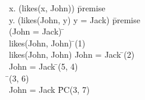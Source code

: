 \documentclass{article}
\begin{document}
\begin{proofbox}
\: \forall x. (likes(x, John)) \= \hbox{premise} \\
\: \forall y. (likes(John, y) \rightarrow y = Jack) \= \hbox{premise} \\
\open
\: \lnot (John = Jack) \= \asm \\
\: likes(John, John) \= \forallelim(1) \\
\: likes(John, John) \rightarrow John = Jack \= \forallelim(2) \\
\: John = Jack \= \implieselim(5, 4) \\
\: \bot \= \notelim(3, 6) \\
\close
\: John = Jack \= PC(3, 7) \\
\end{proofbox}
\end{document}
